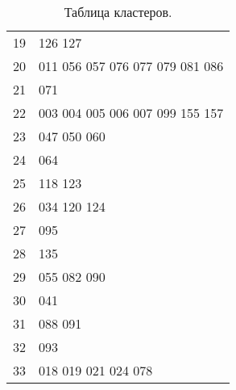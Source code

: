 \documentclass[12pt,fleqn]{article}
\begin{document}
\begin{table}[H]
\begin{center}
\begin{tabular}{|c|l|}
      19 &                          126 127  \\
      20 &  011 056 057 076 077 079 081 086  \\
      21 &                              071  \\
      22 &  003 004 005 006 007 099 155 157  \\
      23 &                      047 050 060  \\
      24 &                              064  \\
      25 &                          118 123  \\
      26 &                      034 120 124  \\
      27 &                              095  \\
      28 &                              135  \\
      29 &                      055 082 090  \\
      30 &                              041  \\
      31 &                          088 091  \\
      32 &                              093  \\
      33 &              018 019 021 024 078  \\

\hline
\bottomrule
\end{tabular}
\caption{Таблица кластеров.}
\label{tabular2}
\end{center}
\end{table}
\end{document}
